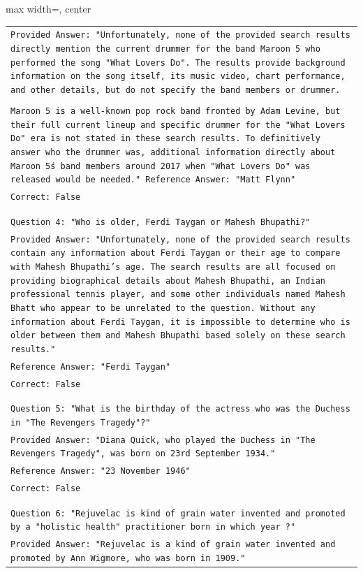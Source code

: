 \documentclass[11pt]{article}
\begin{document}
\begin{table}[ht]
\begin{adjustbox}{max width=\textwidth, center}
\begin{tabular}{>{\raggedright\arraybackslash\tt}p{}<{}}
Provided Answer: "Unfortunately, none of the provided search results directly mention the current drummer for the band Maroon 5 who performed the song "What Lovers Do". The results provide background information on the song itself, its music video, chart performance, and other details, but do not specify the band members or drummer.\\
\\
Maroon 5 is a well-known pop rock band fronted by Adam Levine, but their full current lineup and specific drummer for the "What Lovers Do" era is not stated in these search results. To definitively answer who the drummer was, additional information directly about Maroon 5\'s band members around 2017 when "What Lovers Do" was released would be needed."
Reference Answer: "Matt Flynn"\\
Correct: False\\
\\
\\
Question 4: "Who is older, Ferdi Taygan or Mahesh Bhupathi?"\\
Provided Answer: "Unfortunately, none of the provided search results contain any information about Ferdi Taygan or their age to compare with Mahesh Bhupathi's age. The search results are all focused on providing biographical details about Mahesh Bhupathi, an Indian professional tennis player, and some other individuals named Mahesh Bhatt who appear to be unrelated to the question. Without any information about Ferdi Taygan, it is impossible to determine who is older between them and Mahesh Bhupathi based solely on these search results."\\
Reference Answer: "Ferdi Taygan"\\
Correct: False\\
\\
\\
Question 5: "What is the birthday of the actress who was the Duchess in "The Revengers Tragedy"?"\\
Provided Answer: "Diana Quick, who played the Duchess in "The Revengers Tragedy", was born on 23rd September 1934."\\
Reference Answer: "23 November 1946"\\
Correct: False\\
\\
\\
Question 6: "Rejuvelac is kind of grain water invented and promoted by a "holistic health" practitioner born in which year ?"\\
Provided Answer: "Rejuvelac is a kind of grain water invented and promoted by Ann Wigmore, who was born in 1909."\\

\end{tabular}
\end{adjustbox}
\end{table}
\end{document}
